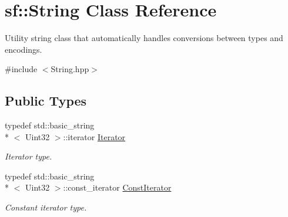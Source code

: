 \hypertarget{classsf_1_1String}{\section{sf\-:\-:String Class Reference}
\label{classsf_1_1String}
}


Utility string class that automatically handles conversions between types and encodings.  




{\ttfamily \#include $<$String.\-hpp$>$}

\subsection*{Public Types}
\begin{DoxyCompactItemize}
\item 
\hypertarget{classsf_1_1String_ac90f2b7b28f703020f8d027e98806235}{typedef std\-::basic\-\_\-string\\*
$<$ Uint32 $>$\-::iterator \hyperlink{classsf_1_1String_ac90f2b7b28f703020f8d027e98806235}{Iterator}}\label{classsf_1_1String_ac90f2b7b28f703020f8d027e98806235}

\begin{DoxyCompactList}\small\item\em Iterator type. \end{DoxyCompactList}\item 
\hypertarget{classsf_1_1String_a8e18efc2e8464f6eb82818902d527efa}{typedef std\-::basic\-\_\-string\\*
$<$ Uint32 $>$\-::const\-\_\-iterator \hyperlink{classsf_1_1String_a8e18efc2e8464f6eb82818902d527efa}{Const\-Iterator}}\label{classsf_1_1String_a8e18efc2e8464f6eb82818902d527efa}

\begin{DoxyCompactList}\small\item\em Constant iterator type. \end{DoxyCompactList}\end{DoxyCompactItemize}
